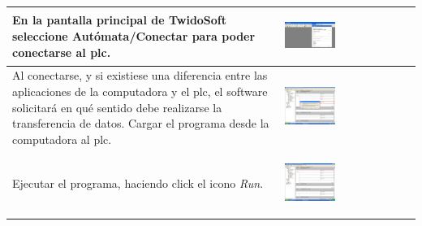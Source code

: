\begin{table}[H]
\centering
\renewcommand*{\arraystretch}{0.01}
\begin{tabular}{*{2}{m{}}}
\hline
    En la pantalla principal de TwidoSoft seleccione 
Autómata/Conectar para poder conectarse al \gls{plc}.
    &\begin{center}
      \includegraphics[width=0.4\textwidth]
	{Anexos/images/twidosoft.PNG}
    \end{center}\\
\hline
    Al conectarse, y si existiese una diferencia entre las aplicaciones
de la computadora y el \gls{plc}, el software solicitará en qué sentido debe
realizarse la transferencia de datos.
Cargar el programa desde la computadora al \gls{plc}.
    &\begin{center}
      \includegraphics[width=0.4\textwidth]
	{Anexos/images/twidosoftcargar.PNG}
    \end{center}\\
\hline
    Ejecutar el programa, haciendo click el icono \emph{Run}.
    &\begin{center}
      \includegraphics[width=0.4\textwidth]
	{Anexos/images/twidosoftrun.PNG}
    \end{center}\\

\end{tabular}
\end{table}
